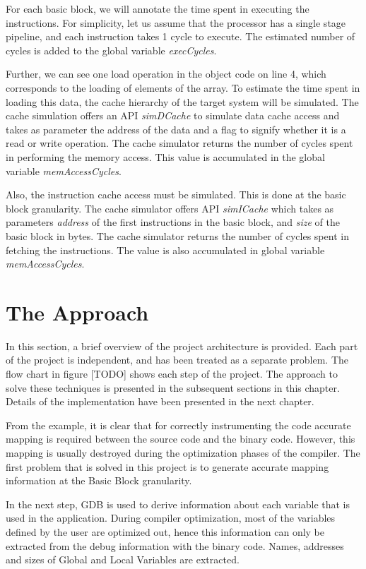 For each basic block, we will annotate the time spent in executing the instructions. For simplicity, let us assume that the processor has a single stage pipeline, and each instruction takes 1 cycle to execute. The estimated number of cycles is added to the global variable \textit{execCycles}.

Further, we can see one load operation in the object code on line 4, which corresponds to the loading of elements of the array. To estimate the time spent in loading this data, the cache hierarchy of the target system will be simulated. The cache simulation offers an API \textit{simDCache} to simulate data cache access and takes as parameter the address of the data and a flag to signify whether it is a read or write operation. The cache simulator returns the number of cycles spent in performing the memory access. This value is accumulated in the global variable \textit{memAccessCycles}. 

Also, the instruction cache access must be simulated. This is done at the basic block granularity. The cache simulator offers API \textit{simICache} which takes as parameters \textit{address} of the first instructions in the basic block, and \textit{size} of the basic block in bytes. The cache simulator returns the number of cycles spent in fetching the instructions. The value is also accumulated in global variable \textit{memAccessCycles}.

\section{The Approach}
In this section, a brief overview of the project architecture is provided. Each part of the project is independent, and has been treated as a separate problem. The flow chart in figure [TODO] shows each step of the project. The approach to solve these techniques is presented in the subsequent sections in this chapter. Details of the implementation have been presented in the next chapter.

From the example, it is clear that for correctly instrumenting the code accurate mapping is required between the source code and the binary code. However, this mapping is usually destroyed during the optimization phases of the compiler. The first problem that is solved in this project is to generate accurate mapping information at the Basic Block granularity. 

In the next step, GDB is used to derive information about each variable that is used in the application. During compiler optimization, most of the variables defined by the user are optimized out, hence this information can only be extracted from the debug information with the binary code. Names, addresses and sizes of Global and Local Variables are extracted.

